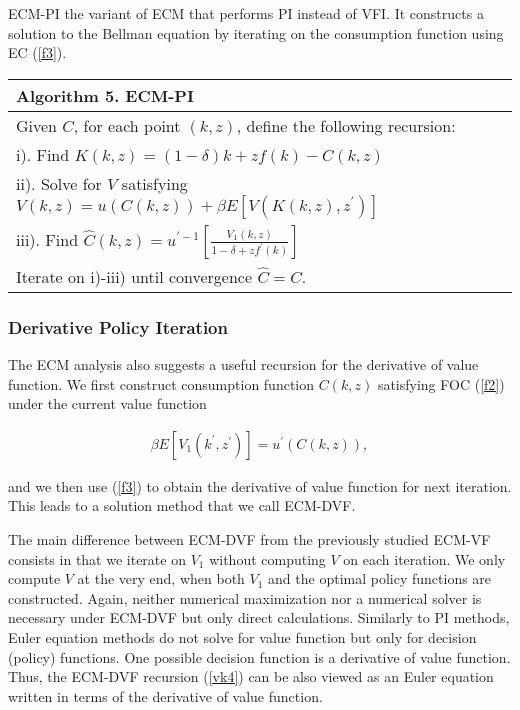 ECM-PI the variant of ECM that performs PI instead of VFI. It constructs a
solution to the Bellman equation by iterating on the consumption function using
EC (\ref{f3}).

\qquad \newline

{\small
\begin{tabular}{l}
\hline \hline
\textbf{Algorithm 5. ECM-PI} \\ \hline
Given $C$, for each point $\left( k,z\right) $, define the following
recursion: \\
\quad i). Find $K\left(k, z\right) = \left( 1 - \delta \right) k+zf\left(k\right) - C\left(k, z\right)$ \\
\quad ii). Solve for $V$ satisfying $V\left(k, z\right) = u\left( C\left(k, z\right) \right) + \beta E\left[ V\left(K\left(k, z\right), z^{\prime}\right) \right]$ \\
\quad iii). Find $\widehat{C}\left(k, z\right) = u^{\prime -1}\left[\frac{V_{1}\left(k, z\right)}{1 - \delta + z f^{\prime }\left(k\right)}\right]$ \\
Iterate on i)-iii) until convergence $\widehat{C}=C$. \\ \hline \hline
\end{tabular}%
}

\qquad

\subsubsection{Derivative Policy Iteration}

The ECM analysis also suggests a useful recursion for the derivative of value
function. We first construct consumption function $C\left(k, z\right)$
satisfying FOC (\ref{f2}) under the current value function

\begin{align}
\beta E\left[V_{1}\left( k^{\prime },z^{\prime }\right) \right] = u^{\prime }\left(C\left(k, z\right) \right), \label{vk4}
\end{align}

and we then use (\ref{f3}) to obtain the derivative of value function for next
iteration. This leads to a solution method that we call ECM-DVF.

The main difference between ECM-DVF from the previously studied ECM-VF consists
in that we iterate on $V_{1}$ without computing $V$ on each iteration. We only
compute $V$ at the very end, when both $V_{1}$ and the optimal policy functions
are constructed. Again, neither numerical maximization nor a numerical solver
is necessary under ECM-DVF but only direct calculations. Similarly to PI
methods, Euler equation methods do not solve for value function but only for
decision (policy) functions. One possible decision function is a derivative of
value function. Thus, the ECM-DVF recursion (\ref{vk4}) can be also viewed as
an Euler equation written in terms of the derivative of value function.

